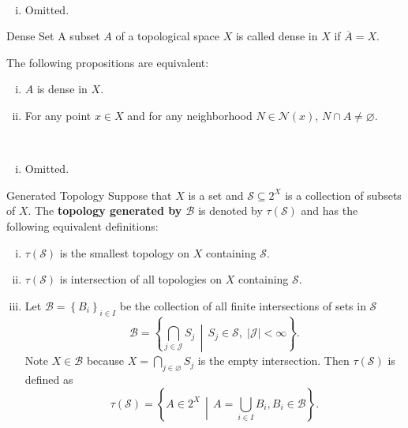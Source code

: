 \documentclass{report}
\newcommand{\midv}{\,\middle\vert\,}
\begin{document}
\begin{prf}~\\ \vspace{-1em}
	\begin{enumerate}[(i)] 
		\item Omitted.
	\end{enumerate}
\end{prf}


\begin{definition}{Dense Set}{}
	A subset $A$ of a topological space $X$ is called dense in $X$ if  $\overline{A}=X$.
\end{definition}

\begin{proposition}{}{}
	The following propositions are equivalent:
	\begin{enumerate}[(i)] 
		\item $A$ is dense in $X$.
		\item For any point $x \in X$ and for any neighborhood $N\in\mathcal{N}(x)$, $N\cap A\ne \varnothing$.
	\end{enumerate}
\end{proposition}

\begin{prf}~\\ \vspace{-1em}
	\begin{enumerate}[(i)] 
		\item Omitted.
	\end{enumerate}
\end{prf}


\begin{definition}{Generated Topology}{}
	Suppose that $X$ is a set and $\mathcal{S}\subseteq 2^X$ is a collection of subsets of $X$. The \textbf{topology generated by $\mathcal{B}$} is denoted by $\tau(\mathcal{S})$ and has the following equivalent definitions:
	\begin{enumerate}[(i)] 
		\item $\tau(\mathcal{S})$ is the smallest topology on $X$ containing $\mathcal{S}$.
		\item $\tau(\mathcal{S})$ is intersection of all topologies on $X$ containing $\mathcal{S}$.
		\item Let $\mathcal{B}=\left\{B_i\right\}_{i\in I}$ be the collection of all finite intersections of sets in $\mathcal{S}$
		\[
			\mathcal{B}= \left\{\bigcap_{j\in \mathcal{J}}S_j\midv S_j \in \mathcal{S},\;|\mathcal{J}|<\infty\right\}.
		\]
		Note $X\in \mathcal{B}$ because $X=\bigcap\limits_{j\in \varnothing}S_j$ is the empty intersection. Then $\tau(\mathcal{S})$ is defined as
		\[
			\tau(\mathcal{S})=\left\{A\in 2^X \midv A=\bigcup_{i\in I} B_i,B_i\in\mathcal{B}\right\}.
		\]
	\end{enumerate}
\end{definition}
\end{document}
